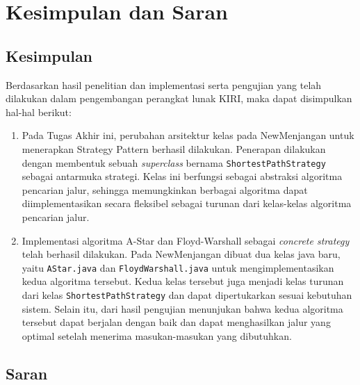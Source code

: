 \chapter{Kesimpulan dan Saran}
\label{chap:kesimpulandansaran}

\section{Kesimpulan}
Berdasarkan hasil penelitian dan implementasi serta pengujian yang telah dilakukan dalam pengembangan perangkat lunak KIRI, maka dapat disimpulkan hal-hal berikut:
\begin{enumerate}
    \item Pada Tugas Akhir ini, perubahan arsitektur kelas pada NewMenjangan untuk menerapkan Strategy Pattern berhasil dilakukan. Penerapan dilakukan dengan membentuk sebuah \textit{superclass} bernama \texttt{ShortestPathStrategy} sebagai antarmuka strategi. Kelas ini berfungsi sebagai abstraksi algoritma pencarian jalur, sehingga memungkinkan berbagai algoritma dapat diimplementasikan secara fleksibel sebagai turunan dari kelas-kelas algoritma pencarian jalur.
    \item Implementasi algoritma A-Star dan Floyd-Warshall sebagai \textit{concrete strategy} telah berhasil dilakukan. Pada NewMenjangan dibuat dua kelas java baru, yaitu \texttt{AStar.java} dan \texttt{FloydWarshall.java} untuk mengimplementasikan kedua algoritma tersebut. Kedua kelas tersebut juga menjadi kelas turunan dari kelas \texttt{ShortestPathStrategy} dan dapat dipertukarkan sesuai kebutuhan sistem. Selain itu, dari hasil pengujian menunjukan bahwa kedua algoritma tersebut dapat berjalan dengan baik dan dapat menghasilkan jalur yang optimal setelah menerima masukan-masukan yang dibutuhkan.
\end{enumerate}

\section{Saran}